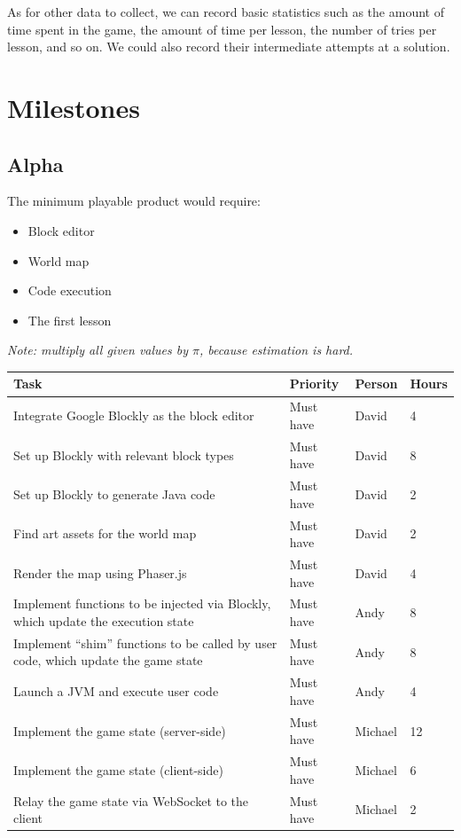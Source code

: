 \documentclass[12pt,notitlepage]{article}
\begin{document}
As for other data to collect, we can record basic statistics such as
the amount of time spent in the game, the amount of time per lesson,
the number of tries per lesson, and so on. We could also record their
intermediate attempts at a solution.

\section{Milestones}

\subsection{Alpha}

The minimum playable product would require:
\begin{itemize}
\item Block editor
\item World map
\item Code execution
\item The first lesson
\end{itemize}

\emph{Note: multiply all given values by $\pi$, because estimation is hard.}

\begin{tabu}{Xlll}
\toprule
Task & Priority & Person & Hours \\
\midrule
Integrate Google Blockly as the block editor & Must have & David & 4 \\
Set up Blockly with relevant block types & Must have & David & 8 \\
Set up Blockly to generate Java code & Must have & David & 2 \\
Find art assets for the world map & Must have & David & 2 \\
Render the map using Phaser.js & Must have & David & 4 \\
Implement functions to be injected via Blockly, which update the execution state & Must have & Andy & 8 \\
Implement ``shim'' functions to be called by user code, which update the game state & Must have & Andy & 8 \\
Launch a JVM and execute user code & Must have & Andy & 4 \\
Implement the game state (server-side) & Must have & Michael & 12 \\
Implement the game state (client-side) & Must have & Michael & 6 \\
Relay the game state via WebSocket to the client & Must have & Michael & 2 \\
\bottomrule
\end{tabu}
\end{document}

